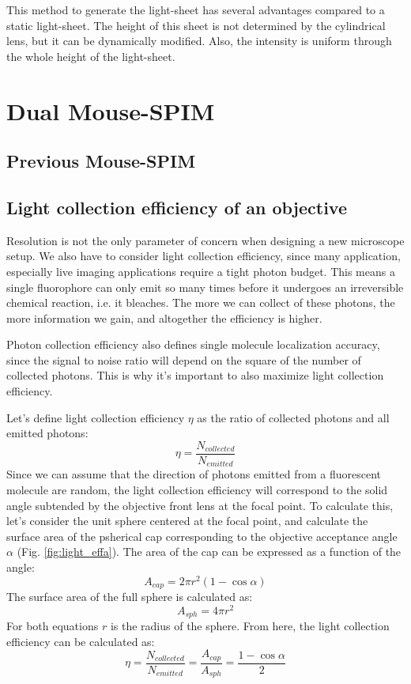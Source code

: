 \documentclass{diploma_style}
\begin{document}
This method to generate the light-sheet has several advantages compared to a static light-sheet. The height of this sheet is not determined by the cylindrical lens, but it can be dynamically modified. Also, the intensity is uniform through the whole height of the light-sheet.
		
		
\chapter{Dual Mouse-SPIM}
	\section{Previous Mouse-SPIM}
	\section{Light collection efficiency of an objective}
	Resolution is not the only parameter of concern when designing a new microscope setup. We also have to consider light collection efficiency, since many application, especially live imaging applications require a tight photon budget. This means a single fluorophore can only emit so many times before it undergoes an irreversible chemical reaction, i.e. it bleaches. The more we can collect of these photons, the more information we gain, and altogether the efficiency is higher.
	
	Photon collection efficiency also defines single molecule localization accuracy, since the signal to noise ratio will depend on the square of the number of collected photons. This is why it's important to also maximize light collection efficiency.
	
	Let's define light collection efficiency $\eta$ as the ratio of collected photons and all emitted photons:
	\[
	\eta = \frac{N_{collected}}{N_{emitted}}
	\]
	Since we can assume that the direction of photons emitted from a fluorescent molecule are random, the light collection efficiency will correspond to the solid angle subtended by the objective front lens at the focal point. To calculate this, let's consider the unit sphere centered at the focal point, and calculate the surface area of the psherical cap corresponding to the objective acceptance angle $\alpha$ (Fig. \ref{fig:light_effa}). The area of the cap can be expressed as a function of the angle:
	\[
	A_{cap} = 2\pi r^2 (1-\cos \alpha)
	\]
	The surface area of the full sphere is calculated as:
	\[
	A_{sph} = 4 \pi r^2
	\]
	For both equations $r$ is the radius of the sphere. From here, the light collection efficiency can be calculated as:
	\[
	\eta = \frac{N_{collected}}{N_{emitted}} = \frac{A_{cap}}{A_{sph}} = \frac{1-\cos \alpha}{2}
	\]
\end{document}
